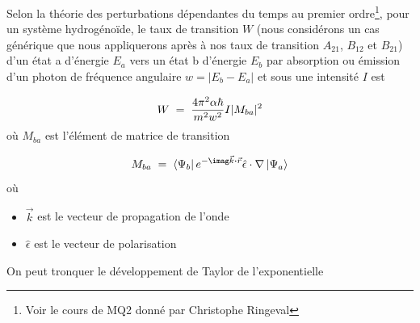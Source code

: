 Selon la théorie des perturbations dépendantes du temps au premier ordre\footnote{Voir le cours de MQ2 donné par Christophe Ringeval}, pour un système hydrogénoïde, le taux de transition $W$ (nous considérons un cas générique que nous appliquerons après à nos taux de transition $A_{21}$, $B_{12}$ et $B_{21}$) d'un état a d'énergie $E_a$ vers un état b d'énergie $E_b$ par absorption ou émission d'un photon de fréquence angulaire $w=|E_b-E_a|$ et sous une intensité $I$ est

\begin{equation}
    W\; = \; \dfrac{4\pi^2 \alpha \hbar}{m^2 w^2}I|M_{ba}|^2
\end{equation}
où $M_{ba}$ est l'élément de matrice de transition

\begin{equation}
    M_{ba}\eq \bra{\Psi_b}e^{-\imag\vec{k}\Cdot \vec{r}}\hat{\epsilon}\cdot\nabla \ket{\Psi_a}
    \label{Mba}
\end{equation}
où

\begin{itemize}[label=$\bullet$]
    \item $\vec{k}$ est le vecteur de propagation de l'onde
    \item $\hat{\epsilon}$ est le vecteur de polarisation
\end{itemize}
On peut tronquer le développement de Taylor de l'exponentielle

